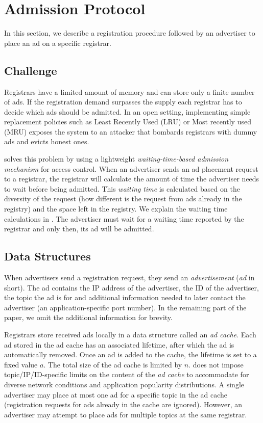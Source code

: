 
\section{Admission Protocol}\label{sec:admission}
In this section, we describe a registration procedure followed by an advertiser to place an ad on a specific registrar.

\subsection{Challenge}
Registrars have a limited amount of memory and can store only a finite number of ads. If the registration demand surpasses the supply each registrar has to decide which ads should be admitted. In an open setting, implementing simple replacement policies such as Least Recently Used (LRU) or Most recently used (MRU) exposes the system to an attacker that bombards registrars with dummy ads and evicts honest ones.

\sysname solves this problem by using a lightweight \textit{waiting-time-based admission mechanism} for access control. When an advertiser sends an ad placement request to a registrar, the registrar will calculate the amount of time the advertiser needs to wait before being admitted. This \emph{waiting time} is calculated based on the diversity of the request (\ie how different is the request from ads already in the registry) and the space left in the registry. We explain the waiting time calculations in . The advertiser must wait for a waiting time reported by the registrar and only then, its ad will be admitted.  

\subsection{Data Structures}
When advertisers send a registration request, they send an \emph{advertisement} (\emph{ad} in short). The ad contains the IP address of the advertiser, the ID of the advertiser, the topic the ad is for and additional information needed to later contact the advertiser (\eg an application-specific port number). In the remaining part of the paper, we omit the additional information for brevity. 

Registrars store received ads locally in a data structure called an \emph{ad cache}. Each ad stored in the ad cache has an associated lifetime, after which the ad is automatically removed. Once an ad is added to the cache, the lifetime is set to a fixed value $a$. The total size of the ad cache is limited by $n$. \sysname does not impose topic/IP/ID-specific limits on the content of the \emph{ad cache} to accommodate for diverse network conditions and application popularity distributions.
A single advertiser may place at most one ad for a specific topic in the ad cache (registration requests for ads already in the cache are ignored).
However, an advertiser may attempt to place ads for multiple topics at the same registrar.


